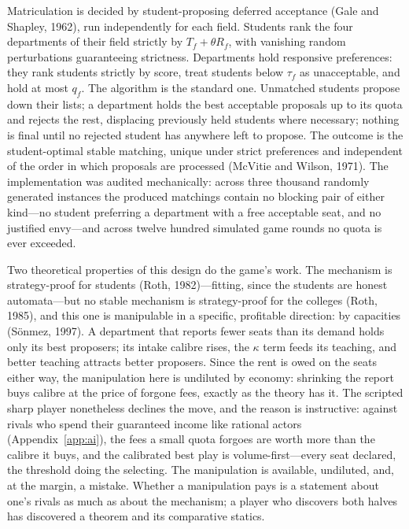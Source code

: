 \documentclass[11pt,a4paper]{article}
\begin{document}
Matriculation is decided by student-proposing deferred acceptance (Gale and Shapley, 1962), run independently for each field. Students rank the four departments of their field strictly by $T_f + \theta R_f$, with vanishing random perturbations guaranteeing strictness. Departments hold responsive preferences: they rank students strictly by score, treat students below $\tau_f$ as unacceptable, and hold at most $q_f$. The algorithm is the standard one. Unmatched students propose down their lists; a department holds the best acceptable proposals up to its quota and rejects the rest, displacing previously held students where necessary; nothing is final until no rejected student has anywhere left to propose. The outcome is the student-optimal stable matching, unique under strict preferences and independent of the order in which proposals are processed (McVitie and Wilson, 1971). The implementation was audited mechanically: across three thousand randomly generated instances the produced matchings contain no blocking pair of either kind---no student preferring a department with a free acceptable seat, and no justified envy---and across twelve hundred simulated game rounds no quota is ever exceeded.

Two theoretical properties of this design do the game's work. The mechanism is strategy-proof for students (Roth, 1982)---fitting, since the students are honest automata---but no stable mechanism is strategy-proof for the colleges (Roth, 1985), and this one is manipulable in a specific, profitable direction: by capacities (S\"onmez, 1997). A department that reports fewer seats than its demand holds only its best proposers; its intake calibre rises, the $\kappa$ term feeds its teaching, and better teaching attracts better proposers. Since the rent is owed on the seats either way, the manipulation here is undiluted by economy: shrinking the report buys calibre at the price of forgone fees, exactly as the theory has it. The scripted sharp player nonetheless declines the move, and the reason is instructive: against rivals who spend their guaranteed income like rational actors (Appendix~\ref{app:ai}), the fees a small quota forgoes are worth more than the calibre it buys, and the calibrated best play is volume-first---every seat declared, the threshold doing the selecting. The manipulation is available, undiluted, and, at the margin, a mistake. Whether a manipulation pays is a statement about one's rivals as much as about the mechanism; a player who discovers both halves has discovered a theorem and its comparative statics.
\end{document}
